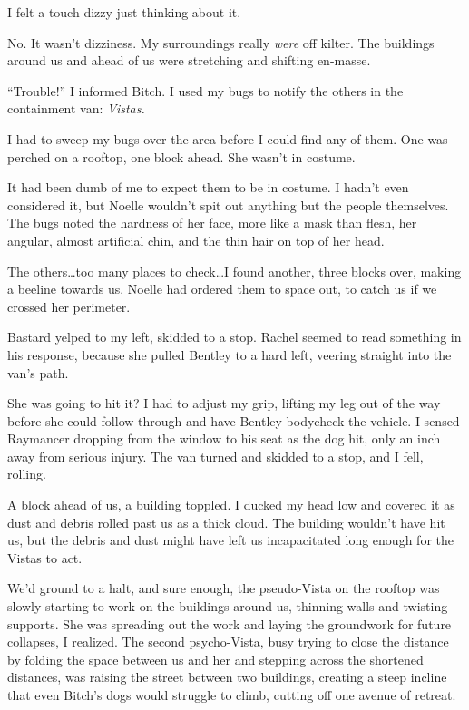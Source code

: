 I felt a touch dizzy just thinking about it.



No.  It wasn't dizziness.  My surroundings really \emph{were} off kilter.  The buildings around us and ahead of us were stretching and shifting en-masse.



``Trouble!'' I informed Bitch.  I used my bugs to notify the others in the containment van: \emph{Vistas.}



I had to sweep my bugs over the area before I could find any of them.  One was perched on a rooftop, one block ahead.  She wasn't in costume.



It had been dumb of me to expect them to be in costume.  I hadn't even considered it, but Noelle wouldn't spit out anything but the people themselves.  The bugs noted the hardness of her face, more like a mask than flesh, her angular, almost artificial chin, and the thin hair on top of her head.



The others\ldots too many places to check\ldots I found another, three blocks over, making a beeline towards us.  Noelle had ordered them to space out, to catch us if we crossed her perimeter.



Bastard yelped to my left, skidded to a stop.  Rachel seemed to read something in his response, because she pulled Bentley to a hard left, veering straight into the van's path.



She was going to hit it?  I had to adjust my grip, lifting my leg out of the way before she could follow through and have Bentley bodycheck the vehicle.  I sensed Raymancer dropping from the window to his seat as the dog hit, only an inch away from serious injury.  The van turned and skidded to a stop, and I fell, rolling.



A block ahead of us, a building toppled.  I ducked my head low and covered it as dust and debris rolled past us as a thick cloud.  The building wouldn't have hit us, but the debris and dust might have left us incapacitated long enough for the Vistas to act.



We'd ground to a halt, and sure enough, the pseudo-Vista on the rooftop was slowly starting to work on the buildings around us, thinning walls and twisting supports.  She was spreading out the work and laying the groundwork for future collapses, I realized.  The second psycho-Vista, busy trying to close the distance by folding the space between us and her and stepping across the shortened distances, was raising the street between two buildings, creating a steep incline that even Bitch's dogs would struggle to climb, cutting off one avenue of retreat.



